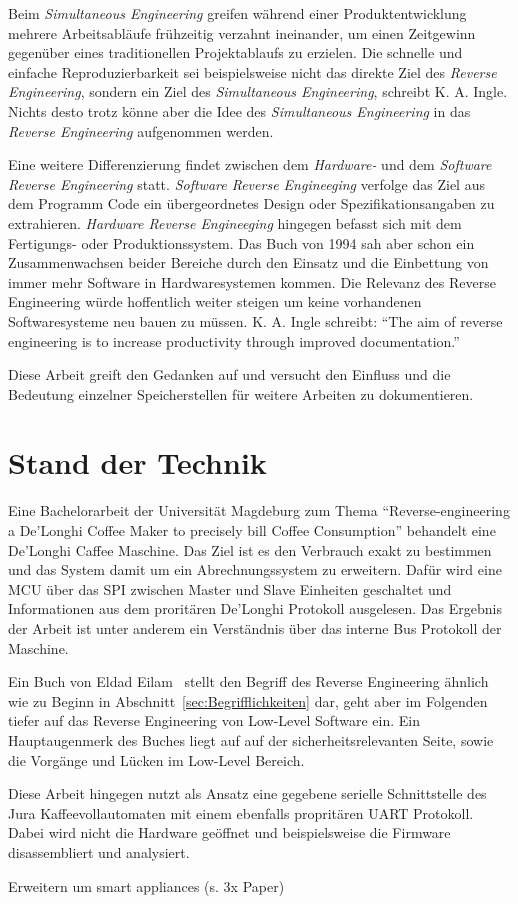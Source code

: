Beim \textit{Simultaneous Engineering} greifen während einer Produktentwicklung mehrere Arbeitsabläufe frühzeitig verzahnt ineinander, um einen Zeitgewinn gegenüber eines traditionellen Projektablaufs zu erzielen.
Die schnelle und einfache Reproduzierbarkeit sei beispielsweise nicht das direkte Ziel des \textit{Reverse Engineering}, sondern ein Ziel des \textit{Simultaneous Engineering}, schreibt K. A. Ingle.
Nichts desto trotz könne aber die Idee des \textit{Simultaneous Engineering} in das \textit{Reverse Engineering} aufgenommen werden.

Eine weitere Differenzierung findet zwischen dem \textit{Hardware-} und dem \textit{Software Reverse Engineering} statt.
\textit{Software Reverse Engineeging} verfolge das Ziel aus dem Programm Code ein übergeordnetes Design oder Spezifikationsangaben zu extrahieren.
\textit{Hardware Reverse Engineeging} hingegen befasst sich mit dem Fertigungs- oder Produktionssystem.
Das Buch von 1994 sah aber schon ein Zusammenwachsen beider Bereiche durch den Einsatz und die Einbettung von immer mehr Software in Hardwaresystemen kommen.
Die Relevanz des Reverse Engineering würde hoffentlich weiter steigen um keine vorhandenen Softwaresysteme neu bauen zu müssen.
K. A. Ingle schreibt: "`The aim of reverse engineering is to increase productivity through improved documentation."'\cite{Solr-153077417}

Diese Arbeit greift den Gedanken auf und versucht den Einfluss und die Bedeutung einzelner Speicherstellen für weitere Arbeiten zu dokumentieren.

\section{Stand der Technik}
Eine Bachelorarbeit der Universität Magdeburg zum Thema "`Reverse-engineering a De'Longhi Coffee Maker to precisely bill Coffee Consumption"'\cite{BachelorarbeitDeLonghi} behandelt eine De'Longhi Caffee Maschine.
Das Ziel ist es den Verbrauch exakt zu bestimmen und das System damit um ein Abrechnungssystem zu erweitern.
Dafür wird eine \ac{MCU} über das \ac{SPI} zwischen Master und Slave Einheiten geschaltet und Informationen aus dem proritären De'Longhi Protokoll ausgelesen.
Das Ergebnis der Arbeit ist unter anderem ein Verständnis über das interne Bus Protokoll der Maschine.

Ein Buch von Eldad Eilam~\cite{Solr-480966761} stellt den Begriff des Reverse Engineering ähnlich wie zu Beginn in Abschnitt~\ref{sec:Begrifflichkeiten} dar, geht aber im Folgenden tiefer auf das Reverse Engineering von Low-Level Software ein.
Ein Hauptaugenmerk des Buches liegt auf auf der sicherheitsrelevanten Seite, sowie die Vorgänge und Lücken im Low-Level Bereich.

Diese Arbeit hingegen nutzt als Ansatz eine gegebene serielle Schnittstelle des Jura Kaffeevollautomaten mit einem ebenfalls propritären \ac{UART} Protokoll. Dabei wird nicht die Hardware geöffnet und beispielsweise die Firmware disassembliert und analysiert.

\todo Erweitern um smart appliances (s. 3x Paper)
